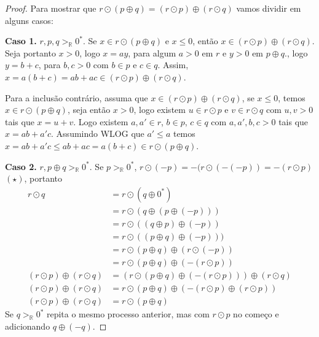 \documentclass[11pt]{article}
\newcommand{\mbb}[1]{\mathbb{#1}}
\newcommand{\gtr}{>_\mbb{R}}
\begin{document}
\begin{proof}
    Para mostrar que $r\odot(p \oplus q)=(r\odot p)\oplus (r\odot q)$ vamos dividir em alguns casos:

    \textbf{Caso 1.} $r,p, q\gtr0^*$. Se $x\in r\odot(p \oplus q)$ e $x\leq 0$, então $x\in(r\odot p)\oplus(r\odot q)$. Seja portanto $x>0$, logo $x=ay$, para algum $a>0$ em $r$ e $y>0$ em $p\oplus q$., logo $y=b+c$, para $b,c>0$ com $b\in p$ e $c\in q$. Assim, $x=a(b+c)=ab+ac\in (r\odot p)\oplus(r\odot q)$.

    Para a inclusão contrário, assuma que $x\in (r\odot p)\oplus (r\odot q)$, se $x\leq 0$, temos $x\in r\odot(p\oplus q)$, seja então $x>0$, logo existem $u\in r\odot p$ e $v\in r\odot q$ com $u,v>0$ tais que $x=u+v$. Logo existem $a,a'\in r$, $b\in p$, $c\in q$ com $a,a',b,c>0$ tais que $x=ab+a'c$. Assumindo WLOG que $a'\leq a$ temos $x=ab+a'c\leq ab+ac=a(b+c)\in r\odot(p\oplus q)$.

    \textbf{Caso 2.} $r,p\oplus q\gtr0^*$. Se $p\gtr0^*$, $r\odot(-p)=-(r\odot(-(-p))=-(r\odot p)$ $(\star)$, portanto
    \begin{align*}
        r\odot q & = r\odot(q\oplus0^*)\tag{A3}\\
        & = r\odot(q\oplus(p\oplus(-p)))\tag{A4}\\
        & = r\odot((q\oplus p)\oplus(-p))\tag{A1}\\
        & = r\odot((p\oplus q)\oplus(-p)))\tag{A2}\\
        & = r\odot(p\oplus q)\oplus(r\odot(-p))\tag{Caso 1.}\\
        & = r\odot(p\oplus q)\oplus(-(r\odot p))\tag{$\star$}\\
        (r\odot p)\oplus(r\odot q) & = (r\odot(p\oplus q)\oplus(-(r\odot p)))\oplus(r\odot q)\\
        (r\odot p)\oplus(r\odot q)& = r\odot(p\oplus q)\oplus(-(r\odot p)\oplus(r\odot p))\tag{A1}\\
        (r\odot p)\oplus(r\odot q) & = r\odot(p\oplus q)\tag{A4}
    \end{align*}
    Se $q\gtr0^*$ repita o mesmo processo anterior, mas com $r\odot p$ no começo e adicionando $q\oplus(-q)$.


\end{proof}
\end{document}
